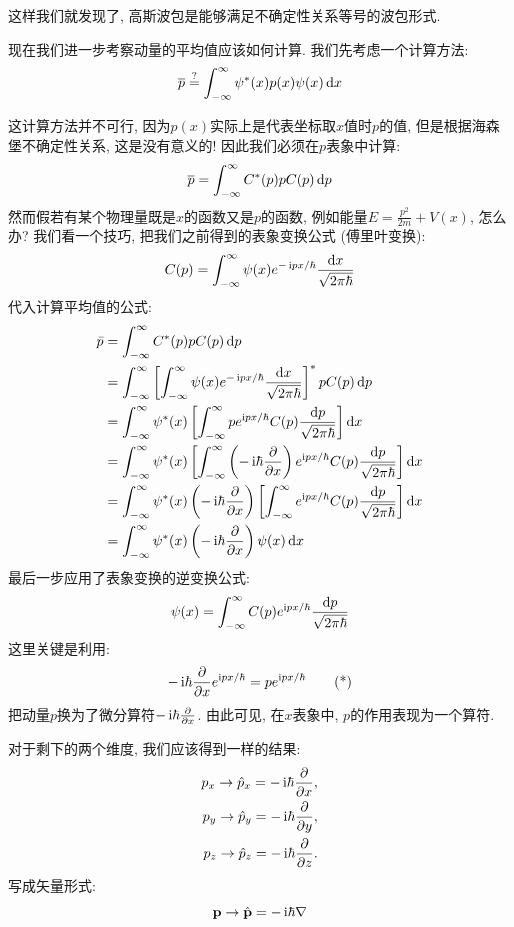 这样我们就发现了, 高斯波包是能够满足不确定性关系等号的波包形式.

现在我们进一步考察动量的平均值应该如何计算. 我们先考虑一个计算方法:
\[
\overline{p} \stackrel{?}{=} \int_{-\infty}^{\infty} \psi^*(x) p(x) \psi(x) \mathop{}\!\mathrm{d} x
\]

这计算方法并不可行, 因为$p(x)$实际上是代表坐标取$x$值时$p$的值, 但是根据海森堡不确定性关系, 这是没有意义的! 因此我们必须在$p$表象中计算:
\[
\overline{p} = \int_{-\infty}^{\infty} C^*(p) p C(p) \mathop{}\!\mathrm{d} p
\]
然而假若有某个物理量既是$x$的函数又是$p$的函数, 例如能量$E=\frac{p^2}{2m}+V(x)$, 怎么办? 我们看一个技巧, 把我们之前得到的表象变换公式 (傅里叶变换):
\[
C(p) = \int_{-\infty}^{\infty} \psi(x) e^{-\mathop{}\!\mathrm{i} px/\hbar} \frac{\mathop{}\!\mathrm{d} x}{\sqrt{2\pi\hbar}}
\]
代入计算平均值的公式:
\begin{align*}
\bar{p} &= \int_{-\infty}^{\infty} C^*(p) p C(p) \d p \\
&= \int_{-\infty}^{\infty} \left[ \int_{-\infty}^{\infty} \psi(x) e^{-\i px/\hbar} \frac{\d x}{\sqrt{2\pi\hbar}} \right]^* p C(p) \d p \\
&= \int_{-\infty}^{\infty} \psi^*(x) \left[ \int_{-\infty}^{\infty} p e^{\i px/\hbar} C(p) \frac{\d p}{\sqrt{2\pi\hbar}} \right] \d x \\
&= \int_{-\infty}^{\infty} \psi^*(x) \left[ \int_{-\infty}^{\infty} \left( -\i\hbar \frac{\partial}{\partial x} \right) e^{\i px/\hbar} C(p) \frac{\d p}{\sqrt{2\pi\hbar}} \right] \d x \\
&= \int_{-\infty}^{\infty} \psi^*(x) \left( -\i\hbar \frac{\partial}{\partial x} \right) \left[ \int_{-\infty}^{\infty} e^{\i px/\hbar} C(p) \frac{\d p}{\sqrt{2\pi\hbar}} \right] \d x \\
&= \int_{-\infty}^{\infty} \psi^*(x) \left( -\i\hbar \frac{\partial}{\partial x} \right) \psi(x) \d x
\end{align*}
最后一步应用了表象变换的逆变换公式:
\[
\psi(x) = \int_{-\infty}^{\infty} C(p) e^{\mathop{}\!\mathrm{i} px/\hbar} \frac{\mathop{}\!\mathrm{d} p}{\sqrt{2\pi\hbar}}
\]
这里关键是利用:
\[
-\mathop{}\!\mathrm{i}\hbar \frac{\partial}{\partial x} e^{\mathop{}\!\mathrm{i} px/\hbar} = p e^{\mathop{}\!\mathrm{i} px/\hbar} \tag{*}
\]
把动量$p$换为了微分算符$-\mathop{}\!\mathrm{i}\hbar\frac{\partial}{\partial x}$. 由此可见, 在$x$表象中, $p$的作用表现为一个算符.

对于剩下的两个维度, 我们应该得到一样的结果:
\begin{align*}
p_x \to \hat{p}_x = -\mathop{}\!\mathrm{i}\hbar \frac{\partial}{\partial x}, \\
p_y \to \hat{p}_y = -\mathop{}\!\mathrm{i}\hbar \frac{\partial}{\partial y}, \\
p_z \to \hat{p}_z = -\mathop{}\!\mathrm{i}\hbar \frac{\partial}{\partial z}.
\end{align*}
写成矢量形式:
\[
\mathbf{p} \to \hat{\mathbf{p}} = -\mathop{}\!\mathrm{i}\hbar \nabla
\]

